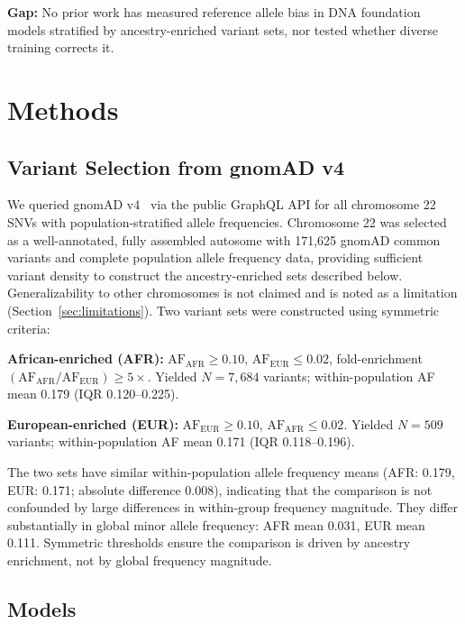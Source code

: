 \documentclass[conference]{IEEEtran}
\begin{document}
\noindent\textbf{Gap:} No prior work has measured reference allele bias in DNA
foundation models stratified by ancestry-enriched variant sets, nor tested
whether diverse training corrects it.

\section{Methods}

\subsection{Variant Selection from gnomAD v4}

We queried gnomAD v4~\cite{gnomad_v4} via the public GraphQL API for all
chromosome 22 SNVs with population-stratified allele frequencies. Chromosome 22
was selected as a well-annotated, fully assembled autosome with 171{,}625
gnomAD common variants and complete population allele frequency data, providing
sufficient variant density to construct the ancestry-enriched sets described
below. Generalizability to other chromosomes is not claimed and is noted as a
limitation (Section~\ref{sec:limitations}). Two variant
sets were constructed using symmetric criteria:

\noindent\textbf{African-enriched (AFR):} $\text{AF}_\text{AFR} \geq 0.10$,
$\text{AF}_\text{EUR} \leq 0.02$, fold-enrichment
$(\text{AF}_\text{AFR}/\text{AF}_\text{EUR}) \geq 5\times$.
Yielded $N{=}7{,}684$ variants; within-population AF mean 0.179 (IQR 0.120--0.225).

\noindent\textbf{European-enriched (EUR):} $\text{AF}_\text{EUR} \geq 0.10$,
$\text{AF}_\text{AFR} \leq 0.02$.
Yielded $N{=}509$ variants; within-population AF mean 0.171 (IQR 0.118--0.196).

The two sets have similar within-population allele frequency means (AFR: 0.179,
EUR: 0.171; absolute difference 0.008), indicating that the comparison is not
confounded by large differences in within-group frequency magnitude. They differ
substantially in global minor allele frequency: AFR mean 0.031, EUR mean 0.111.
Symmetric thresholds ensure the comparison is driven by ancestry enrichment, not
by global frequency magnitude.

\subsection{Models}
\end{document}
